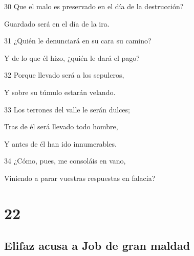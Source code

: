 \par 30 Que el malo es preservado en el día de la destrucción?
\par Guardado será en el día de la ira.
\par 31 ¿Quién le denunciará en su cara su camino?
\par Y de lo que él hizo, ¿quién le dará el pago?
\par 32 Porque llevado será a los sepulcros,
\par Y sobre su túmulo estarán velando.
\par 33 Los terrones del valle le serán dulces;
\par Tras de él será llevado todo hombre,
\par Y antes de él han ido innumerables.
\par 34 ¿Cómo, pues, me consoláis en vano,
\par Viniendo a parar vuestras respuestas en falacia? 


\chapter{22}

\section*{Elifaz acusa a Job de gran maldad}

